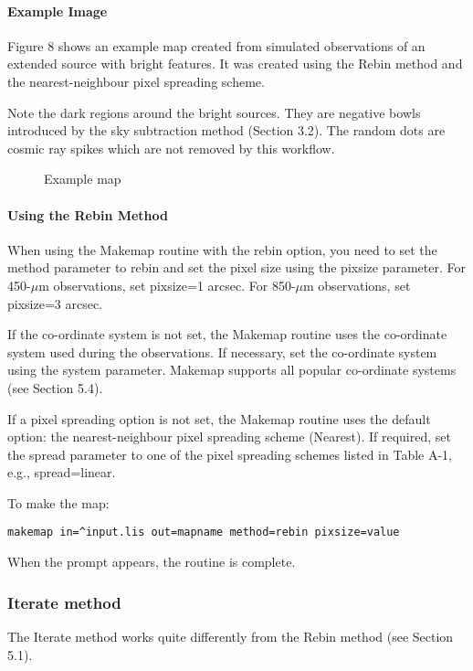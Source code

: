\documentclass[twoside,11pt]{article}
\renewcommand{\_}{\texttt{\symbol{95}}}
\begin{document}
\paragraph{Example Image}

Figure 8 shows an example map created from simulated observations of
an extended source with bright features. It was created using the
Rebin method and the nearest-neighbour pixel spreading scheme.

Note the dark regions around the bright sources. They are negative
bowls introduced by the sky subtraction method (Section 3.2). The
random dots are cosmic ray spikes which are not removed by this
workflow.

\begin{figure}
\caption{Example map}
\end{figure}

\paragraph{Using the Rebin Method}

When using the Makemap routine with the rebin option, you need to set
the method parameter to rebin and set the pixel size using the pixsize
parameter. For 450-$\mu$m observations, set pixsize=1 arcsec. For
850-$\mu$m observations, set pixsize=3 arcsec.

If the co-ordinate system is not set, the Makemap routine uses the
co-ordinate system used during the observations. If necessary, set the
co-ordinate system using the system parameter.  Makemap supports all
popular co-ordinate systems (see Section 5.4).

If a pixel spreading option is not set, the Makemap routine uses the
default option: the nearest-neighbour pixel spreading scheme
(Nearest). If required, set the spread parameter to one of the pixel
spreading schemes listed in Table A-1, e.g., spread=linear.

To make the map:
\begin{verbatim}
makemap in=^input.lis out=mapname method=rebin pixsize=value
\end{verbatim}
When the prompt appears, the routine is complete.

\subsubsection{Iterate method}

The Iterate method works quite differently from the Rebin method (see
Section 5.1).
\end{document}
